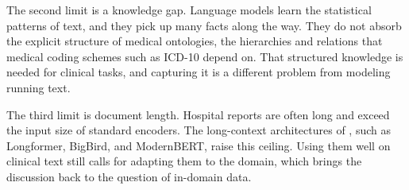 The second limit is a knowledge gap. Language models learn the statistical patterns of
text, and they pick up many facts along the way. They do not absorb the explicit structure
of medical ontologies, the hierarchies and relations that medical coding schemes such as
ICD-10 depend on. That structured knowledge is needed for clinical tasks, and capturing it
is a different problem from modeling running text.

The third limit is document length. Hospital reports are often long and exceed the input
size of standard encoders. The long-context architectures of , such as
Longformer, BigBird, and ModernBERT, raise this ceiling. Using them well on clinical text
still calls for adapting them to the domain, which brings the discussion back to the
question of in-domain data.
